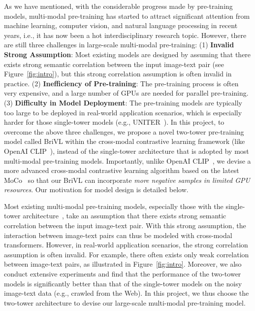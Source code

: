\documentclass[10pt,twocolumn,letterpaper]{article}
\begin{document}
As we have mentioned, with the considerable progress made by pre-training models, multi-modal pre-training has started to attract significant attention from machine learning, computer vision, and natural language processing in recent years, i.e., it has now been a hot interdisciplinary research topic. However, there are still three challenges in large-scale multi-modal pre-training: (1) \textbf{Invalid Strong Assumption}: Most existing models are designed by assuming that there exists strong semantic correlation between the input image-text pair (see Figure~\ref{fig:intro}), but this strong correlation assumption is often invalid in practice. (2) \textbf{Inefficiency of Pre-training}: The pre-training process is often very expensive, and a large number of GPUs are needed for parallel pre-training. (3) \textbf{Difficulty in Model Deployment}: The pre-training models are typically too large to be deployed in real-world application scenarios, which is especially harder for those single-tower models (e.g., UNITER~\cite{chen2020uniter}). In this project, to overcome the above three challenges, we propose a novel two-tower pre-training model called BriVL within the cross-modal contrastive learning framework (like OpenAI CLIP~\cite{radford2021learning}), instead of the single-tower architecture that is adopted by most multi-modal pre-training models. Importantly, unlike OpenAI CLIP~\cite{radford2021learning}, we devise a more advanced cross-modal contrastive learning algorithm based on the latest MoCo~\cite{he2020momentum} so that our BriVL can incorporate \emph{more negative samples in limited GPU resources}. Our motivation for model design is detailed below.

Most existing multi-modal pre-training models, especially those with the single-tower architecture~\cite{li2020oscar,uppal2020emerging,qi2020imagebert,xia2020xgpt,desai2020virtex,gan2020large,yu2020ernie,messina2020fine,cho2020x,gu2020self}, take an assumption that there exists strong semantic correlation between the input image-text pair. With this strong assumption, the interaction between image-text pairs can thus be modeled with cross-modal transformers. However, in real-world application scenarios, the strong correlation assumption is often invalid. For example, there often exists only weak correlation between image-text pairs, as illustrated in Figure~\ref{fig:intro}. Moreover, we also conduct extensive experiments and find that the performance of the two-tower models is significantly better than that of the single-tower models on the noisy image-text data (e.g., crawled from the Web). In this project, we thus choose the two-tower architecture to devise our large-scale multi-modal pre-training model.
\end{document}

